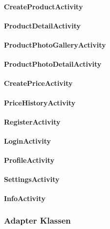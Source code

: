 \documentclass{scrartcl}
\begin{document}
\paragraph{CreateProductActivity}

\paragraph{ProductDetailActivity}

\paragraph{ProductPhotoGalleryActivity}

\paragraph{ProductPhotoDetailActivity}

\paragraph{CreatePriceActivity}

\paragraph{PriceHistoryActivity}

\paragraph{RegisterActivity}

\paragraph{LoginActivity}

\paragraph{ProfileActivity}

\paragraph{SettingsActivity}

\paragraph{InfoActivity}

\subsubsection{Adapter Klassen}
\end{document}
